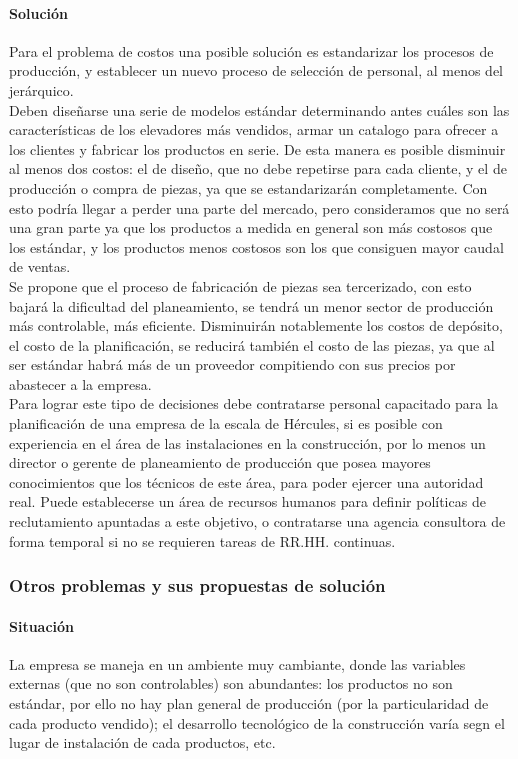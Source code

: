 \documentclass[12pt,a4paper,spanish]{article}
\begin{document}
\paragraph{Soluci\'on}
Para el problema de costos una posible soluci\'on es estandarizar los procesos de producci\'on, y establecer un nuevo proceso de selecci\'on de personal, al menos del jer\'arquico.\\
Deben dise\~narse una serie de modelos est\'andar determinando antes cu\'ales son las caracter\'isticas de los elevadores m\'as vendidos, armar un catalogo para ofrecer a los clientes y fabricar los productos en serie. De esta manera es posible disminuir al menos dos costos: el de dise\~no, que no debe repetirse para cada cliente, y el de producci\'on o compra de piezas, ya que se estandarizar\'an completamente. Con esto podr\'ia llegar a perder una parte del mercado, pero consideramos que no ser\'{a} una gran parte ya que los productos a medida en general son m\'as costosos que los est\'andar, y los productos menos costosos son los que consiguen mayor caudal de ventas.\\
Se propone que el proceso de fabricaci\'on de piezas sea tercerizado, con esto bajar\'a la dificultad del planeamiento, se tendr\'{a} un menor sector de producci\'on m\'{a}s controlable, m\'as eficiente. Disminuir\'an notablemente los costos de dep\'osito, el costo de la planificaci\'on, se reducir\'a tambi\'en el costo de las piezas, ya que al ser est\'andar habr\'a m\'as de un proveedor compitiendo con sus precios por abastecer a la empresa.\\
Para lograr este tipo de decisiones debe contratarse personal capacitado para la planificaci\'on de una empresa de la escala de H\'ercules, si es posible con experiencia en el \'area de las instalaciones en la construcci\'on, por lo menos un director o gerente de planeamiento de producci\'on que posea mayores conocimientos que los t\'ecnicos de este \'area, para poder ejercer una autoridad real. Puede establecerse un \'area de recursos humanos para definir pol\'iticas de reclutamiento apuntadas a este objetivo, o contratarse una agencia consultora de forma temporal si no se requieren tareas de RR.HH. continuas.

\subsubsection{Otros problemas y sus propuestas de soluci\'on}

\paragraph{Situaci\'on}
La empresa se maneja en un ambiente muy cambiante, donde las variables externas (que no son controlables) son abundantes: los productos no son est\'andar, por ello no hay plan general de producci\'on (por la particularidad de cada producto vendido); el desarrollo tecnol\'ogico de la construcci\'on var\'ia segn el lugar de instalaci\'on de cada productos, etc.
\end{document}
